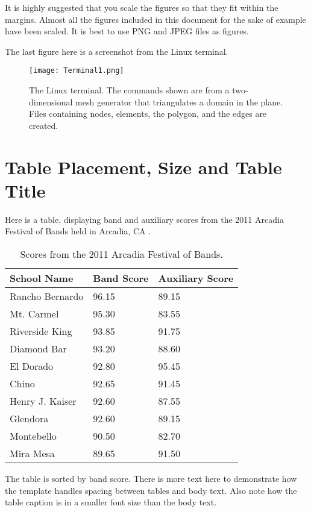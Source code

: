 It is highly suggested that you scale the figures so that they fit within the margins. Almost all the figures included in this document for the sake of example have been scaled. It is best to use PNG and JPEG files as figures.

The last figure here is a screenshot from the Linux terminal.

\begin{figure}[H]
	\centering
	\texttt{[image: Terminal1.png]}
	\caption{The Linux terminal. The commands shown are from a two-dimensional mesh generator that triangulates a domain in the plane. Files containing nodes, elements, the polygon, and the edges are created.}
\end{figure}

\section{Table Placement, Size and Table Title}

Here is a table, displaying band and auxiliary scores from the 2011 Arcadia Festival of Bands held in Arcadia, CA \cite{ARCADIA}.

\begin{table}[h!]
	\centering

	\label{Band}
	\begin{tabular}{|l|l|l|}
		\hline
		School Name & Band Score & Auxiliary Score \\ \hline
		Rancho Bernardo & 96.15 & 89.15 \\ \hline
		Mt. Carmel & 95.30 & 83.55 \\ \hline
		Riverside King & 93.85 & 91.75 \\ \hline
		Diamond Bar & 93.20 & 88.60 \\ \hline
		El Dorado & 92.80 & 95.45 \\ \hline
		Chino & 92.65 & 91.45 \\ \hline
		Henry J. Kaiser & 92.60 & 87.55 \\ \hline
		Glendora & 92.60 & 89.15 \\ \hline
		Montebello & 90.50 & 82.70 \\ \hline
		Mira Mesa & 89.65 & 91.50 \\ \hline
	\end{tabular}
	\caption{Scores from the 2011 Arcadia Festival of Bands.}
\end{table}

The table is sorted by band score. There is more text here to demonstrate how the template handles spacing between tables and body text. Also note how the table caption is in a smaller font size than the body text.

